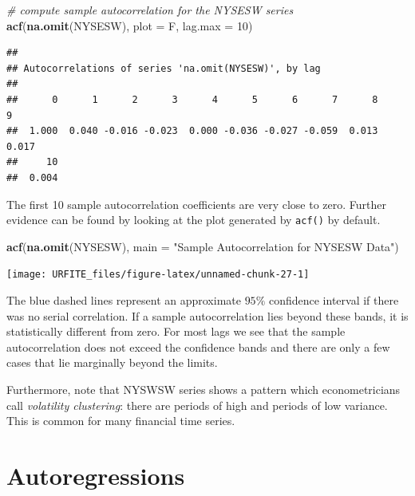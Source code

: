 \documentclass[]{book}
\newenvironment{Shaded}{\begin{snugshade}}{\end{snugshade}}
\newcommand{\KeywordTok}[1]{\textcolor[rgb]{0.13,0.29,0.53}{\textbf{#1}}}
\newcommand{\DataTypeTok}[1]{\textcolor[rgb]{0.13,0.29,0.53}{#1}}
\newcommand{\DecValTok}[1]{\textcolor[rgb]{0.00,0.00,0.81}{#1}}
\newcommand{\StringTok}[1]{\textcolor[rgb]{0.31,0.60,0.02}{#1}}
\newcommand{\CommentTok}[1]{\textcolor[rgb]{0.56,0.35,0.01}{\textit{#1}}}
\newcommand{\NormalTok}[1]{#1}
\theoremstyle{definition}
\theoremstyle{definition}
\theoremstyle{definition}
\theoremstyle{remark}
\begin{document}
\begin{Shaded}
\begin{Highlighting}[]
\CommentTok{# compute sample autocorrelation for the NYSESW series}
\KeywordTok{acf}\NormalTok{(}\KeywordTok{na.omit}\NormalTok{(NYSESW), }\DataTypeTok{plot =}\NormalTok{ F, }\DataTypeTok{lag.max =} \DecValTok{10}\NormalTok{)}
\end{Highlighting}
\end{Shaded}

\begin{verbatim}
## 
## Autocorrelations of series 'na.omit(NYSESW)', by lag
## 
##      0      1      2      3      4      5      6      7      8      9 
##  1.000  0.040 -0.016 -0.023  0.000 -0.036 -0.027 -0.059  0.013  0.017 
##     10 
##  0.004
\end{verbatim}

The first 10 sample autocorrelation coefficients are very close to zero.
Further evidence can be found by looking at the plot generated by
\texttt{acf()} by default.

\begin{Shaded}
\begin{Highlighting}[]
\KeywordTok{acf}\NormalTok{(}\KeywordTok{na.omit}\NormalTok{(NYSESW), }\DataTypeTok{main =} \StringTok{"Sample Autocorrelation for NYSESW Data"}\NormalTok{)}
\end{Highlighting}
\end{Shaded}

\begin{center}\texttt{[image: URFITE\_files/figure-latex/unnamed-chunk-27-1]} \end{center}

The blue dashed lines represent an approximate \(95\%\) confidence
interval if there was no serial correlation. If a sample autocorrelation
lies beyond these bands, it is statistically different from zero. For
most lags we see that the sample autocorrelation does not exceed the
confidence bands and there are only a few cases that lie marginally
beyond the limits.

Furthermore, note that NYSWSW series shows a pattern which
econometricians call \emph{volatility clustering}: there are periods of
high and periods of low variance. This is common for many financial time
series.

\section{Autoregressions}\label{autoregressions}
\end{document}
